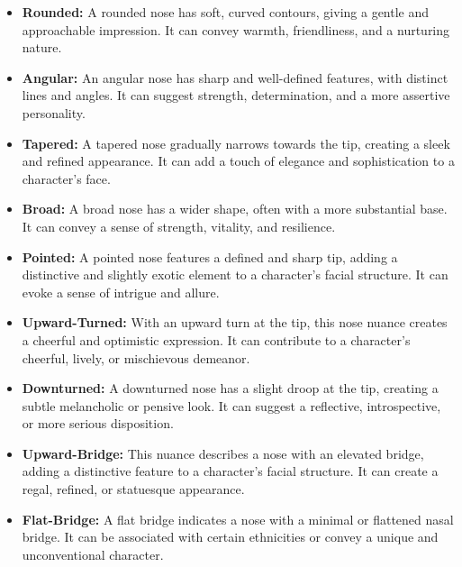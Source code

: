 \documentclass[12pt]{book}
\begin{document}
\begin{itemize}
    \item \textbf{Rounded:} A rounded nose has soft, curved contours, giving a gentle and approachable impression. It can convey warmth, friendliness, and a nurturing nature.
    
    \item \textbf{Angular:} An angular nose has sharp and well-defined features, with distinct lines and angles. It can suggest strength, determination, and a more assertive personality.
    
    \item \textbf{Tapered:} A tapered nose gradually narrows towards the tip, creating a sleek and refined appearance. It can add a touch of elegance and sophistication to a character's face.
    
    \item \textbf{Broad:} A broad nose has a wider shape, often with a more substantial base. It can convey a sense of strength, vitality, and resilience.
    
    \item \textbf{Pointed:} A pointed nose features a defined and sharp tip, adding a distinctive and slightly exotic element to a character's facial structure. It can evoke a sense of intrigue and allure.
    
    \item \textbf{Upward-Turned:} With an upward turn at the tip, this nose nuance creates a cheerful and optimistic expression. It can contribute to a character's cheerful, lively, or mischievous demeanor.
    
    \item \textbf{Downturned:} A downturned nose has a slight droop at the tip, creating a subtle melancholic or pensive look. It can suggest a reflective, introspective, or more serious disposition.
    
    \item \textbf{Upward-Bridge:} This nuance describes a nose with an elevated bridge, adding a distinctive feature to a character's facial structure. It can create a regal, refined, or statuesque appearance.
    
    \item \textbf{Flat-Bridge:} A flat bridge indicates a nose with a minimal or flattened nasal bridge. It can be associated with certain ethnicities or convey a unique and unconventional character.
\end{itemize}
\end{document}
